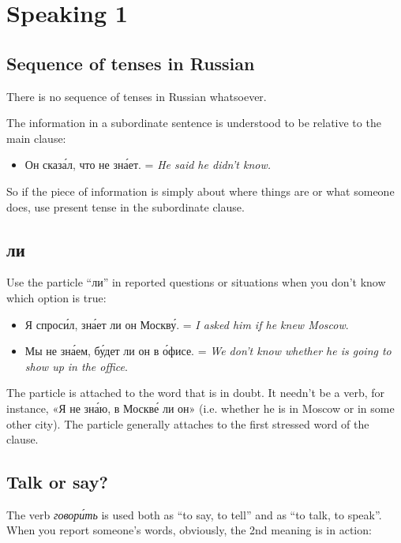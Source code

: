 \chapter{Speaking 1}\label{speaking-1}

\section{Sequence of tenses in
Russian}\label{sequence-of-tenses-in-russian}

There is no sequence of tenses in Russian whatsoever.

The information in a subordinate sentence is understood to be relative
to the main clause:

\begin{itemize}
\tightlist
\item
  Он сказ\'{а}л, что не зн\'{а}ет. = \emph{He said he didn't know.}
\end{itemize}

So if the piece of information is simply about where things are or what
someone does, use present tense in the subordinate clause.

\section{ли}\label{ux43bux438}

Use the particle ``ли'' in reported questions or situations when you
don't know which option is true:

\begin{itemize}
\tightlist
\item
  Я спрос\'{и}л, зн\'{а}ет ли он Москв\'{у}. = \emph{I asked him if he knew Moscow}.
\item
  Мы не зн\'{а}ем, б\'{у}дет ли он в \'{о}фисе. = \emph{We don't know whether he is
  going to show up in the office}.
\end{itemize}

The particle is attached to the word that is in doubt. It needn't be a
verb, for instance, «Я не зн\'{а}ю, в Москв\'{е} ли он» (i.e. whether he is in
Moscow or in some other city). The particle generally attaches to the
first stressed word of the clause.

\section{Talk or say?}\label{talk-or-say}

The verb \emph{говор\'{и}ть} is used both as ``to say, to tell'' and as ``to
talk, to speak''. When you report someone's words, obviously, the 2nd
meaning is in action:

